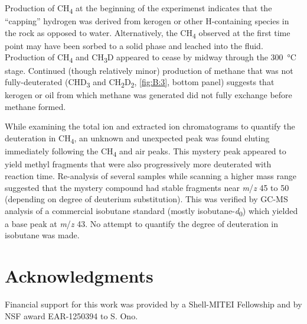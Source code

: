 Production of CH\textsubscript{4} at the beginning of the experimenst
indicates that the ``capping'' hydrogen was derived from kerogen or
other H-containing species in the rock as opposed to water.
Alternatively, the CH\textsubscript{4} observed at the first time point
may have been sorbed to a solid phase and leached into the fluid.
Production of CH\textsubscript{4} and CH\textsubscript{3}D appeared to
cease by midway through the 300~°C stage. Continued (though relatively
minor) production of methane that was not fully-deuterated
(CHD\textsubscript{3} and CH\textsubscript{2}D\textsubscript{2}, \autoref{fig:B:3},
bottom panel) suggests that kerogen or oil from which methane was
generated did not fully exchange before methane formed.

While examining the total ion and extracted ion chromatograms to
quantify the deuteration in CH\textsubscript{4}, an unknown and
unexpected peak was found eluting immediately following the
CH\textsubscript{4} and air peaks. This mystery peak appeared to yield
methyl fragments that were also progressively more deuterated with
reaction time. Re-analysis of several samples while scanning a higher
mass range suggested that the mystery compound had stable fragments near
\emph{m}/\emph{z} 45 to 50 (depending on degree of deuterium
substitution). This was verified by GC-MS analysis of a commercial
isobutane standard (mostly isobutane-\textit{d}\textsubscript{0}) which yielded a
base peak at \emph{m}/\emph{z} 43. No attempt to quantify the degree of
deuteration in isobutane was made.

\section{Acknowledgments}\label{acknowledgments-4}

Financial support for this work was provided by a Shell-MITEI Fellowship
and by NSF award EAR-1250394 to S. Ono.




